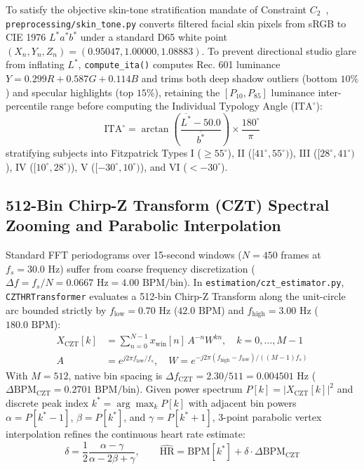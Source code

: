 \documentclass[conference]{IEEEtran}
\begin{document}
To satisfy the objective skin-tone stratification mandate of Constraint $C_2$~\cite{mathworks_rgb2lab}, \texttt{preprocessing/skin\_tone.py} converts filtered facial skin pixels from sRGB to CIE 1976 $L^*a^*b^*$ under a standard D65 white point $(X_n, Y_n, Z_n) = (0.95047, 1.00000, 1.08883)$. To prevent directional studio glare from inflating $L^*$, \texttt{compute\_ita()} computes Rec. 601 luminance $Y = 0.299R + 0.587G + 0.114B$ and trims both deep shadow outliers (bottom $10\%$) and specular highlights (top $15\%$), retaining the $[P_{10}, P_{85}]$ luminance inter-percentile range before computing the Individual Typology Angle ($\text{ITA}^\circ$):
\begin{equation}
\text{ITA}^\circ = \arctan\!\left(\frac{\overline{L^*} - 50.0}{\overline{b^*}}\right) \times \frac{180^\circ}{\pi}
\label{eq:ita}
\end{equation}
stratifying subjects into Fitzpatrick Types I ($\ge 55^\circ$), II ($[41^\circ, 55^\circ)$), III ($[28^\circ, 41^\circ)$), IV ($[10^\circ, 28^\circ)$), V ($[-30^\circ, 10^\circ)$), and VI ($< -30^\circ$).

\subsection{512-Bin Chirp-Z Transform (CZT) Spectral Zooming and Parabolic Interpolation}

Standard FFT periodograms over 15-second windows ($N = 450$ frames at $f_s = 30.0\text{ Hz}$) suffer from coarse frequency discretization ($\Delta f = f_s / N = 0.0667\text{ Hz} = 4.00\text{ BPM/bin}$). In \texttt{estimation/czt\_estimator.py}, \texttt{CZTHRTransformer} evaluates a 512-bin Chirp-Z Transform along the unit-circle arc bounded strictly by $f_{\text{low}} = 0.70\text{ Hz}$ ($42.0\text{ BPM}$) and $f_{\text{high}} = 3.00\text{ Hz}$ ($180.0\text{ BPM}$):
\begin{align}
X_{\text{CZT}}[k] &= \sum_{n=0}^{N-1} x_{\text{win}}[n] \, A^{-n} W^{kn}, \quad k = 0, \dots, M-1 \label{eq:czt} \\
A &= e^{j 2\pi f_{\text{low}} / f_s}, \quad W = e^{-j 2\pi (f_{\text{high}} - f_{\text{low}}) / ((M - 1) f_s)} \nonumber
\end{align}
With $M = 512$, native bin spacing is $\Delta f_{\text{CZT}} = 2.30 / 511 = 0.004501\text{ Hz}$ ($\Delta\text{BPM}_{\text{CZT}} = 0.2701\text{ BPM/bin}$). Given power spectrum $P[k] = \lvert X_{\text{CZT}}[k]\rvert^2$ and discrete peak index $k^* = \arg\max_k P[k]$ with adjacent bin powers $\alpha = P[k^*-1]$, $\beta = P[k^*]$, and $\gamma = P[k^*+1]$, 3-point parabolic vertex interpolation refines the continuous heart rate estimate:
\begin{equation}
\delta = \frac{1}{2}\frac{\alpha - \gamma}{\alpha - 2\beta + \gamma}, \qquad \widehat{\text{HR}} = \text{BPM}[k^*] + \delta \cdot \Delta\text{BPM}_{\text{CZT}}
\label{eq:parabolic}
\end{equation}
\end{document}
